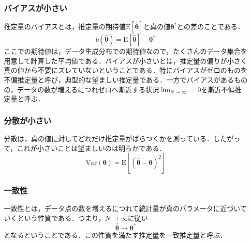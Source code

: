 \documentclass[a4paper,11pt]{jsreport}
\begin{document}
\subsubsection*{バイアスが小さい}
推定量のバイアスとは，推定量の期待値$\mathrm{E} \left[ \hat{\bm{\theta}} \right]$と真の値$\bm{\theta}^*$との差のことである．
\begin{equation}
  b\left( \hat{\bm{\theta}} \right)
  = \mathrm{E} \left[ \hat{\bm{\theta}} \right] - \bm{\theta}^*
\end{equation}
ここでの期待値は，データ生成分布での期待値なので，たくさんのデータ集合を用意して計算した平均値である．バイアスが小さいとは，推定量の偏りが小さく真の値から不要にズレていないということである．特にバイアスがゼロのものを不偏推定量と呼び，典型的な望ましい推定量である．一方でバイアスがあるものの，データの数が増えるにつれゼロへ漸近する状況$\lim_{N \rightarrow \infty} = 0$を漸近不偏推定量と呼ぶ．

\subsubsection*{分散が小さい}
分散は，真の値に対してどれだけ推定量がばらつくかを測っている．したがって，これが小さいことは望ましいのは明らかである．
\begin{equation}
  \text{Var}\left( \bm{\theta} \right)
  = \mathrm{E} \left[ \left( \hat{\bm{\theta}} - \bm{\theta} \right)^2 \right]
\end{equation}

\subsubsection*{一致性}
一致性とは，データ点の数を増えるにつれて統計量が真のパラメータに近づいていくという性質である．つまり，$N \rightarrow \infty$に従い
\begin{equation}
  \hat{\bm{\theta}}
  \rightarrow \bm{\theta}^*
\end{equation}
となるということである．この性質を満たす推定量を一致推定量と呼ぶ．
\end{document}
